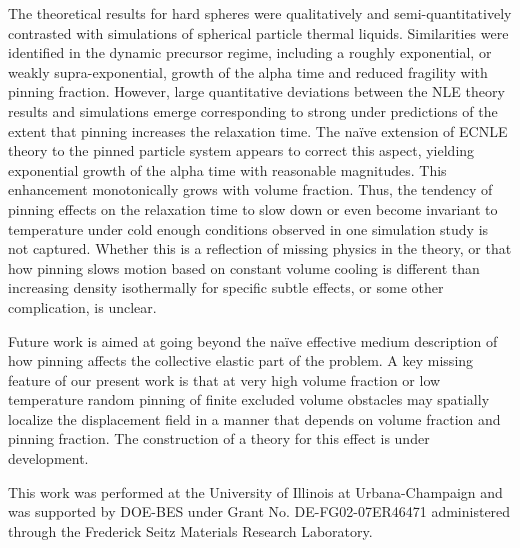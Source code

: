 \documentclass[twocolumn,showpacs,preprintnumbers,amsmath,amssymb,unsortedaddress,
]{revtex4-1}
\begin{document}
The theoretical results for hard spheres were qualitatively and semi-quantitatively contrasted with simulations of spherical particle thermal liquids. Similarities were identified in the dynamic precursor regime, including a roughly exponential, or weakly supra-exponential, growth of the alpha time and reduced fragility with pinning fraction. However, large quantitative deviations between the NLE theory results and simulations emerge corresponding to strong under predictions of the extent that pinning increases the relaxation time. The {na\"ive} extension of ECNLE theory to the pinned particle system appears to correct this aspect, yielding exponential growth of the alpha time with reasonable magnitudes. This enhancement monotonically grows with volume fraction. Thus, the tendency of pinning effects on the relaxation time to slow down or even become invariant to temperature under cold enough conditions observed in one simulation study \cite{25} is not captured. Whether this is a reflection of missing physics in the theory, or that how pinning slows motion based on constant volume cooling is different than increasing density isothermally for specific subtle effects, or some other complication, is unclear. 

Future work is aimed at going beyond the {na\"ive} effective medium description of how pinning affects the collective elastic part of the problem. A key missing feature of our present work is that at very high volume fraction or low temperature random pinning of finite excluded volume obstacles may spatially localize the displacement field in a manner that depends on volume fraction and pinning fraction. The construction of a theory for this effect is under development.


\begin{acknowledgements}
This work was performed at the University of Illinois at Urbana-Champaign and was supported by DOE-BES under Grant No. DE-FG02-07ER46471 administered through the Frederick Seitz Materials Research Laboratory.
\end{acknowledgements}




\appendix{}
\renewcommand{\thesection}{\Alph{section}}
\end{document}
